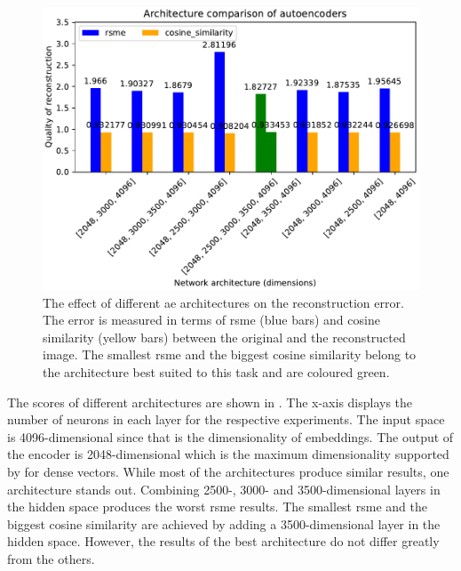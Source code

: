 \begin{figure}[!htb] %
    \centering
    \includegraphics[width=1\textwidth]{images/embeddings/autoencoder/ae_score_plot.pdf}
    \caption[Different \acs*{ae} architectures and their reconstruction error]{The effect of different \acs*{ae} architectures on the reconstruction error.
    The error is measured in terms of \acs*{rsme} (blue bars) and cosine similarity (yellow bars) between the original and the reconstructed image.
    The smallest \acs*{rsme} and the biggest cosine similarity belong to the architecture best suited to this task and are coloured green.
    }
    \label{fig:eval-ae-architecture}
\end{figure}

The scores of different architectures are shown in .
The x-axis displays the number of neurons in each layer for the respective experiments.
The input space is 4096-dimensional since that is the dimensionality of \infersent{} embeddings.
The output of the encoder is 2048-dimensional which is the maximum dimensionality supported by \databaseName{} for dense vectors.
While most of the architectures produce similar results, one architecture stands out.
Combining 2500-, 3000- and 3500-dimensional layers in the hidden space produces the worst \ac{rsme} results.
The smallest \ac{rsme} and the biggest cosine similarity are achieved by adding a 3500-dimensional layer in the hidden space.
However, the results of the best architecture do not differ greatly from the others.